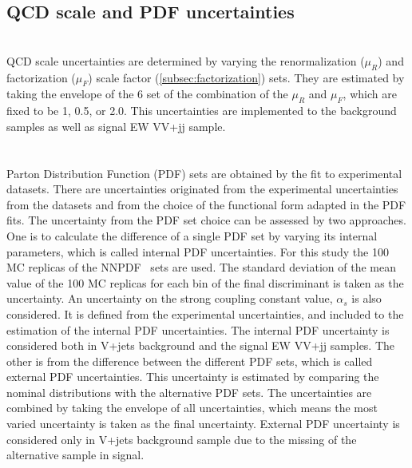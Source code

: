 \subsection{QCD scale and PDF uncertainties}
\noindent\textbf{}\\
QCD scale uncertainties are determined by varying the renormalization ($\mu_R$) and factorization ($\mu_F$) scale factor (\ref{subsec:factorization}) sets. 
They are estimated by taking the envelope of the 6 set of the combination of the $\mu_R$ and $\mu_F$, which are fixed to be 1, 0.5, or 2.0. 
This uncertainties are implemented to the background samples as well as signal EW VV+jj sample.\\ \\
\noindent\textbf{}\\
%
Parton Distribution Function (PDF) sets are obtained by the fit to experimental datasets. There are uncertainties originated from the experimental uncertainties from the datasets and from the choice of the functional form adapted in the PDF fits.
The uncertainty from the PDF set choice can be assessed by two approaches. One is to calculate the difference of a single PDF set by varying its internal parameters, which is called internal PDF uncertainties. For this study the 100 MC replicas of the NNPDF~\cite{Ball:2014uwa} sets are used. 
The standard deviation of the mean value of the 100 MC replicas for each bin of the final discriminant is taken as the uncertainty. 
%
An uncertainty on the strong coupling constant value, $\alpha_s$ is also considered. It is defined from the experimental uncertainties, and included to the estimation of the internal PDF uncertainties. 
The internal PDF uncertainty is considered both in V+jets background and the signal EW VV+jj samples.
%
The other is from the difference between the different PDF sets, which is called external PDF uncertainties. This uncertainty is estimated by comparing the nominal distributions with the alternative PDF sets. The uncertainties are combined by taking the envelope of all uncertainties, which means the most varied uncertainty is taken as the final uncertainty. 
External PDF uncertainty is considered only in V+jets background sample due to the missing of the alternative sample in signal.


